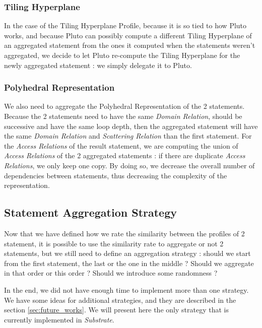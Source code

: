 \documentclass[paper=a4, fontsize=11.5pt]{scrartcl}
\numberwithin{equation}{section}        %
\numberwithin{figure}{section}          %
\numberwithin{table}{section}               %
\begin{document}
        \subsubsection{Tiling Hyperplane}
            In the case of the Tiling Hyperplane Profile, because it is so tied to how
            Pluto works, and because Pluto can possibly compute a different Tiling Hyperplane
            of an aggregated statement from the ones it computed when the statements weren't
            aggregated, we decide to let Pluto re-compute the Tiling Hyperplane for the newly
            aggregated statement : we simply delegate it to Pluto.
        \subsubsection{Polyhedral Representation}
            We also need to aggregate the Polyhedral Representation of the 2 statements.
            Because the 2 statements need to have the same \textit{Domain Relation}, should be
            successive and have the same loop depth, then the aggregated statement will have
            the same \textit{Domain Relation} and \textit{Scattering Relation} than the first
            statement. For the \textit{Access Relations} of the result statement, we
            are computing the union of \textit{Access Relations} of the 2 aggregated statements :
            if there are duplicate \textit{Access Relations}, we only keep one copy.
            By doing so, we decrease the overall number of dependencies between statements,
            thus decreasing the complexity of the representation.
            

    \subsection{Statement Aggregation Strategy}
        Now that we have defined how we rate the similarity between the profiles of 2 statement,
        it is possible to use the similarity rate to aggregate or not 2 statements, but
        we still need to define an aggregation strategy : should we start from the first
        statement, the last or the one in the middle ? Should we aggregate in that order
        or this order ? Should we introduce some randomness ?

        In the end, we did not have enough time to implement more than one strategy. We
        have some ideas for additional strategies, and they are described in the section
        \ref{sec:future_works}. We will present here the only strategy that is currently implemented
        in \textit{Substrate}.
\end{document}
